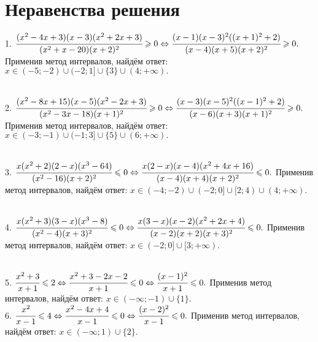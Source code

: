 \section{Неравенства решения}
1. $\cfrac{(x^2-4x+3)(x-3)(x^2+2x+3)}{(x^2+x-20)(x+2)^2}\geqslant0 \Leftrightarrow \cfrac{(x-1)(x-3)^2((x+1)^2+2)}{(x-4)(x+5)(x+2)^2}\geqslant0.$ Применив метод интервалов, найдём ответ: $x\in(-5;-2)\cup(-2;1]\cup\{3\}\cup(4;+\infty).$
\begin{figure}[ht!]
\end{figure}\\
2. $\cfrac{(x^2-8x+15)(x-5)(x^2-2x+3)}{(x^2-3x-18)(x+1)^2}\geqslant0\Leftrightarrow\cfrac{(x-3)(x-5)^2((x-1)^2+2)}{(x-6)(x+3)(x+1)^2}\geqslant0.$ Применив метод интервалов, найдём ответ: $x\in(-3;-1)\cup(-1;3]\cup\{5\}\cup(6;+\infty).$
\begin{figure}[ht!]
\end{figure}\\
3. $\cfrac{x(x^2+2)(2-x)(x^3-64)}{(x^2-16)(x+2)^2}\leqslant 0 \Leftrightarrow \cfrac{x(2-x)(x-4)(x^2+4x+16)}{(x-4)(x+4)(x+2)^2}\leqslant 0.$ Применив метод интервалов, найдём ответ: $x\in(-4;-2)\cup(-2;0]\cup[2;4)\cup(4;+\infty).$
\begin{figure}[ht!]
\end{figure}\\
4. $\cfrac{x(x^2+3)(3-x)(x^3-8)}{(x^2-4)(x+3)^2}\leqslant 0 \Leftrightarrow \cfrac{x(3-x)(x-2)(x^2+2x+4)}{(x-2)(x+2)(x+3)^2}\leqslant 0.$ Применив метод интервалов, найдём ответ: $x\in(-2;0]\cup[3;+\infty).$
\begin{figure}[ht!]
\end{figure}\\
5. $\cfrac{x^2+3}{x+1}\leqslant2 \Leftrightarrow \cfrac{x^2+3-2x-2}{x+1} \leqslant0\Leftrightarrow \cfrac{(x-1)^2}{x+1} \leqslant0.$ Применив метод интервалов, найдём ответ: $x\in(-\infty;-1)\cup\{1\}.$\\
6. $\cfrac{x^2}{x-1}\leqslant4 \Leftrightarrow \cfrac{x^2-4x+4}{x-1}\leqslant0 \Leftrightarrow \cfrac{(x-2)^2}{x-1}\leqslant0.$ Применив метод интервалов, найдём ответ: $x\in(-\infty;1)\cup\{2\}.$\\
